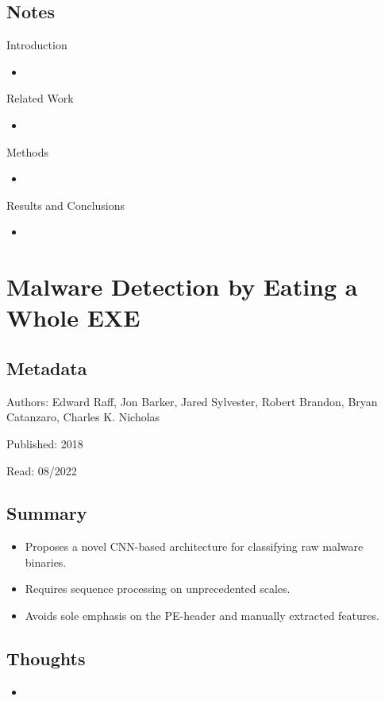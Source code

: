 \documentclass{article}
\begin{document}
\subsection*{Notes}

Introduction
\begin{itemize}
\item
\end{itemize}
Related Work
\begin{itemize}
\item
\end{itemize}
Methods
\begin{itemize}
\item
\end{itemize}
Results and Conclusions
\begin{itemize}
\item
\end{itemize}

\pagebreak


\section*{Malware Detection by Eating a Whole EXE}

\subsection*{Metadata}

\noindent Authors: Edward Raff, Jon Barker, Jared Sylvester, Robert Brandon, Bryan Catanzaro, Charles K. Nicholas

\noindent Published: 2018

\noindent Read: 08/2022

\subsection*{Summary}
\begin{itemize}
\item Proposes a novel CNN-based architecture for classifying raw malware binaries.
\item Requires sequence processing on unprecedented scales.
\item Avoids sole emphasis on the PE-header and manually extracted features.
\end{itemize}

\subsection*{Thoughts}
\begin{itemize}
\item
\end{itemize}
\end{document}
